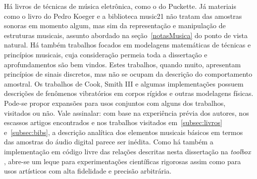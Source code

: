 Há livros de técnicas de música eletrônica, como o do Puckette. Já materiais como o livro do Pedro Koeger e a biblioteca music21 não tratam das amostras sonoras em momento algum, mas sim da representação e manipulação de estruturas musicais, assunto abordado na seção~\ref{notasMusica} do ponto de vista natural. Há também trabalhos focados em modelagens matemáticas de técnicas e princípios musicais, cuja consideração permeia toda a dissertação e aprofundamentos são bem vindos. Estes trabalhos, quando muito, apresentam princípios de sinais discretos, mas não se ocupam da descrição do comportamento amostral. Os trabalhos de Cook, Smith III e algumas implementações possuem descrições de fenômenos vibratórios em corpos rígidos e outras modelagens físicas. Pode-se propor expansões para usos conjuntos com alguns dos trabalhos, visitados ou não. Vale assinalar: com base na experiência prévia dos autores, nos escassos artigos encontrados e nos trabalhos visitados em~\ref{subsec:livros} e~\ref{subsec:bibs}, a descrição analítica dos elementos musicais básicos em termos das amostras do áudio digital parece ser inédita. 
Como há também a implementação em código livre das relações descritas nesta dissertação na \emph{toolbox} \massa, abre-se um leque para experimentações científicas rigorosas assim como para usos artísticos com alta fidelidade e precisão arbitrária.\cite{MASSA} 
